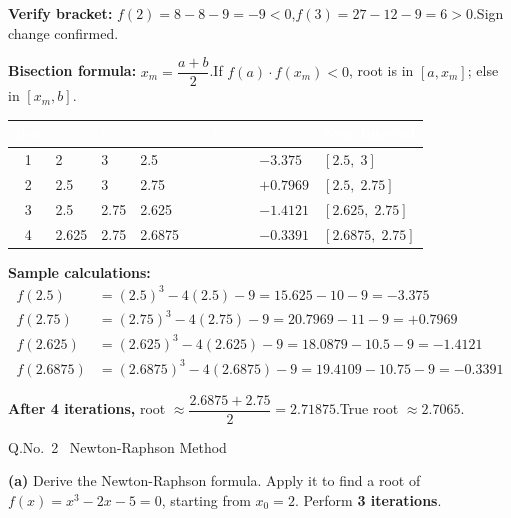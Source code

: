 \documentclass[12pt]{article}
\begin{document}
\begin{ansbox}
\textbf{Verify bracket:}
$f(2) = 8 - 8 - 9 = -9 < 0$,\quad $f(3) = 27 - 12 - 9 = 6 > 0$.\quad Sign change confirmed.\;\checkmark

\medskip
\textbf{Bisection formula:} $x_m = \dfrac{a+b}{2}$.\quad If $f(a)\cdot f(x_m)<0$, root is in $[a,x_m]$; else in $[x_m,b]$.

\medskip
\begin{center}
\begin{tabular}{|c|C{1.4cm}|C{1.4cm}|C{2cm}|C{2.5cm}|C{1.8cm}|}
\hline
{}
\textcolor{white}{\textbf{Iter}} & \textcolor{white}{\textbf{$a$}} & \textcolor{white}{\textbf{$b$}} & \textcolor{white}{\textbf{$x_m=(a+b)/2$}} & \textcolor{white}{\textbf{$f(x_m)$}} & \textcolor{white}{\textbf{New Interval}}\\
 & 2 & 3 & 2.5 & $-3.375$ & $[2.5,\;3]$\\ & 2.5 & 3 & 2.75 & $+0.7969$ & $[2.5,\;2.75]$\\ & 2.5 & 2.75 & 2.625 & $-1.4121$ & $[2.625,\;2.75]$\\ & 2.625 & 2.75 & 2.6875 & $-0.3391$ & $[2.6875,\;2.75]$\\\hline
\end{tabular}
\end{center}

\textbf{Sample calculations:}
\begin{align*}
  f(2.5) &= (2.5)^3 - 4(2.5) - 9 = 15.625 - 10 - 9 = -3.375\\
  f(2.75) &= (2.75)^3 - 4(2.75) - 9 = 20.7969 - 11 - 9 = +0.7969\\
  f(2.625) &= (2.625)^3 - 4(2.625) - 9 = 18.0879 - 10.5 - 9 = -1.4121\\
  f(2.6875) &= (2.6875)^3 - 4(2.6875) - 9 = 19.4109 - 10.75 - 9 = -0.3391
\end{align*}

\textbf{After 4 iterations,} root $\approx \dfrac{2.6875 + 2.75}{2} = \mathbf{2.71875}$.\quad True root $\approx 2.7065$.
\end{ansbox}

\newpage

\begin{qbox}{Q.No.\ 2 \textemdash\ Newton-Raphson Method}
\end{qbox}

\medskip
\textbf{(a)} Derive the Newton-Raphson formula. Apply it to find a root of $f(x) = x^3 - 2x - 5 = 0$, starting from $x_0 = 2$. Perform \textbf{3 iterations}.
\end{document}
